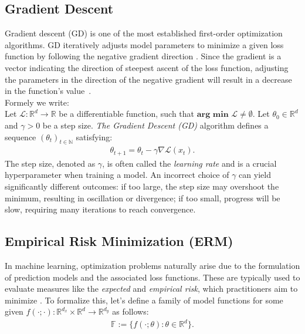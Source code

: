 \subsection{Gradient Descent}
Gradient descent (GD) is one of the most established first-order optimization algorithms. GD iteratively adjusts model
parameters to minimize a given loss function by following the negative gradient direction \cite{toussain2014gradient}.
Since the gradient is a vector indicating the direction of steepest ascent of the loss function, adjusting the parameters in the direction
of the negative gradient will result in a decrease in the function's value~\cite{toussain2014gradient}.\\
Formely we write:\\
\noindent
Let \( \mathcal{L} : \mathbb{R}^d \to \mathbb{R} \) be a differentiable function, such that \(\textbf{arg min } \mathcal{L}  \neq \emptyset \).  
Let \( \theta_0 \in \mathbb{R}^d \) and \( \gamma > 0 \) be a step size.  
\emph{The Gradient Descent (GD)} algorithm defines a sequence \( (\theta_t)_{t \in \mathbb{N}} \) satisfying:
\begin{align}
\theta_{t+1} = \theta_t - \gamma \nabla \mathcal{L}(x_t).
\end{align}
The step size, denoted as $\gamma$, is often called the \emph{learning rate} and is a crucial hyperparameter when training a model.
An incorrect choice of $\gamma$ can yield significantly different outcomes: if too large, the step size may overshoot the minimum, resulting in oscillation or divergence;
if too small, progress will be slow, requiring many iterations to reach convergence. \cite{wu2020wngrad} 


\subsection{Empirical Risk Minimization (ERM) \cite{bottou2018optimization}}
\label{sec:erm}

In machine learning, optimization problems naturally arise due to the formulation of prediction models and the associated loss functions.
These are typically used to evaluate measures like the \emph{expected} and \emph{empirical risk}, which practitioners aim to minimize \cite{bottou2018optimization}.
To formalize this, let's define a family of model functions for some given \( f(\cdot; \cdot) : \mathbb{R}^{d_x} \times \mathbb{R}^d \to \mathbb{R}^{d_y} \) as follows:
\begin{align}
\mathbb{F} := \{ f(\cdot; \theta) : \theta \in \mathbb{R}^d \}.
\end{align}

